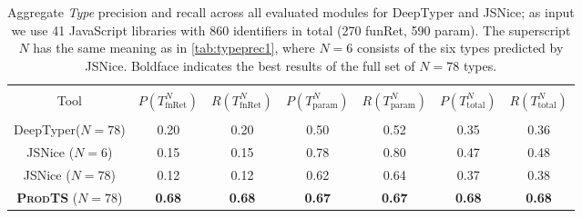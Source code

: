 \documentclass[sigplan,10pt,review,anonymous]{acmart} %
\newcommand{\prodts}{\textsc{ProdTS}\xspace}
\theoremstyle{plain}
\theoremstyle{remark}
\theoremstyle{definition}
\begin{document}
\begin{table*}[t]
  \centering
  \caption{Aggregate \textit{Type} precision and recall across all evaluated modules for DeepTyper and JSNice; as input we use 41 JavaScript libraries with 860 identifiers in total (270 funRet, 590 param).
    The superscript $N$ has the same meaning as in \cref{tab:typeprec1}, where $N = 6$ consists of the six types predicted by JSNice.
    Boldface indicates the best results of the full set of $N=78$ types.}\label{tab:typeprec2}
  \begin{tabular}{ccccccc}
    \toprule                                                                                                                                                                         \\
    Tool                             & $P(T^N_\text{fnRet})$ & $R(T^N_\text{fnRet})$ & $P(T^N_\text{param})$ & $R(T^N_\text{param})$ & $P(T^N_\text{total})$ & $R(T^N_\text{total})$ \\
    \midrule                                                                                                                                                                         \\
    DeepTyper\tiny{($N=78$)}         & 0.20                  & 0.20                  & 0.50                  & 0.52                  & 0.35                  & 0.36                  \\

    JSNice \tiny{($N=6$)}            & 0.15                  & 0.15                  & 0.78                  & 0.80                  & 0.47                  & 0.48                  \\
    JSNice \tiny{($N=78$)}           & 0.12                  & 0.12                  & 0.62                  & 0.64                  & 0.37                  & 0.38                  \\
    \textbf{\prodts} \tiny{($N=78$)} & \textbf{0.68}         & \textbf{0.68}         & \textbf{0.67}         & \textbf{0.67}
                                     & \textbf{0.68}         & \textbf{0.68}                                                                                                         \\
    \bottomrule
  \end{tabular}
\end{table*}
\end{document}
